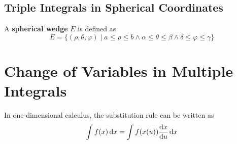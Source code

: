 \documentclass[../Calculus \Roman{3}.tex]{subfiles}
\begin{document}
		\subsection*{Triple Integrals in Spherical Coordinates}
				A \textbf{spherical wedge} $E$ is defined as
					\[E = \{(\rho, \theta, \varphi) \mid a \le \rho \le b \land \alpha \le \theta \le \beta \land \delta \le \varphi \le \gamma\}\]
	\section{Change of Variables in Multiple Integrals}
		In one-dimensional calculus, the substitution rule can be written as 
			\[\int f(x)\,\mathrm{d} x = \int f(x(u))\frac{\mathrm{d} x}{\mathrm{d} u}\,\mathrm{d} x\]
\end{document}
